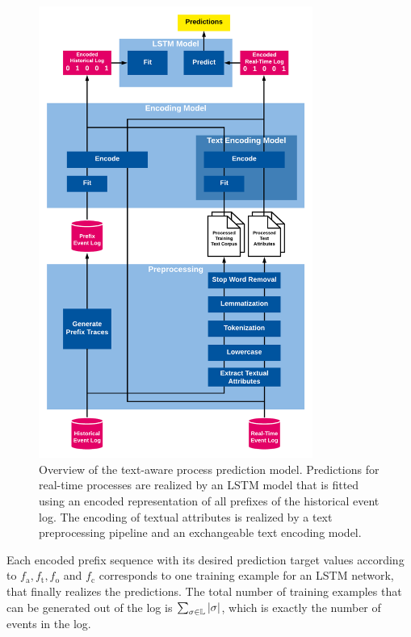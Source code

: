 \begin{figure}[!htbp]
	\centering
	\includegraphics[width=0.8\textwidth]{figures/framework}
	\caption[Overview of the text-aware process prediction model]{Overview of the text-aware process prediction model. Predictions for real-time processes are realized by an LSTM model that is fitted using an encoded representation of all prefixes of the historical event log. The encoding of textual attributes is realized by a text preprocessing pipeline and an exchangeable text encoding model.}
	\label{fig:framework}
\end{figure}

Each encoded prefix sequence with its desired prediction target values according to $f_\mathrm{a}, f_\mathrm{t}, f_\mathrm{o}$ and $f_\mathrm{c}$ corresponds to one training example for an LSTM network, that finally realizes the predictions. 
The total number of training examples that can be generated out of the log is $\sum_{\sigma \in \mathbb{L}}|\sigma|$, which is exactly the number of events in the log.

